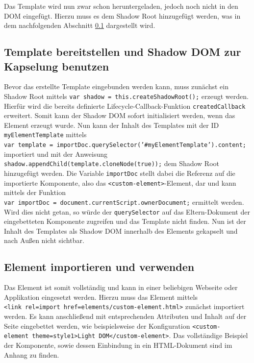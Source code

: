 

Das Template wird nun zwar schon heruntergeladen, jedoch noch nicht in den \ac{DOM} eingefügt. Hierzu muss es dem Shadow Root hinzugefügt werden, was in dem nachfolgenden Abschnitt \ref{template-bereitstellen-und-shadow-dom-zur-kapselung-benutzen} dargestellt wird.


\subsection{Template bereitstellen und Shadow DOM zur Kapselung benutzen}\label{template-bereitstellen-und-shadow-dom-zur-kapselung-benutzen}

Bevor das erstellte Template eingebunden werden kann, muss zunächst ein Shadow Root mittels \texttt{var\ shadow\ =\ this.createShadowRoot();} erzeugt werden. Hierfür wird die bereits definierte Lifecycle-Callback-Funktion \texttt{createdCallback} erweitert. Somit kann der Shadow \ac{DOM} sofort initialisiert werden, wenn das Element erzeugt wurde. Nun kann der Inhalt des Templates mit der ID \texttt{myElementTemplate} mittels \texttt{var\ template\ =\ importDoc.querySelector('\#myElementTemplate').content;} importiert und mit der Anweisung \texttt{shadow.appendChild(template.cloneNode(true));} dem Shadow Root hinzugefügt werden. Die Variable \texttt{importDoc} stellt dabei die Referenz auf die importierte Komponente, also das \texttt{\textless{}custom-element\textgreater{}}-Element, dar und kann mittels der Funktion \texttt{var\ importDoc\ =\ document.currentScript.ownerDocument;} ermittelt werden. Wird dies nicht getan, so würde der \texttt{querySelector} auf das Eltern-Dokument der eingebetteten Komponente zugreifen und das Template nicht finden. Nun ist der Inhalt des Templates als Shadow \ac{DOM} innerhalb des Elements gekapselt und nach Außen nicht sichtbar.

\subsection{Element importieren und verwenden}\label{element-importieren-und-verwenden}

Das Element ist somit vollständig und kann in einer beliebigen Webseite oder Applikation eingesetzt werden. Hierzu muss das Element mittels \texttt{\textless{}link\ rel=\dq import\dq\ href=\dq elements/custom-element.html\dq\textgreater{}} zunächst importiert werden. Es kann anschließend mit entsprechenden Attributen und Inhalt auf der Seite eingebettet werden, wie beispielsweise der Konfiguration \texttt{\textless{}custom-element\ theme=\dq style1\dq\textgreater{}Light DOM\textless{}/custom-element\textgreater{}}. Das vollständige Beispiel der Komponente, sowie dessen Einbindung in ein \ac{HTML}-Dokument sind im Anhang zu finden. 

